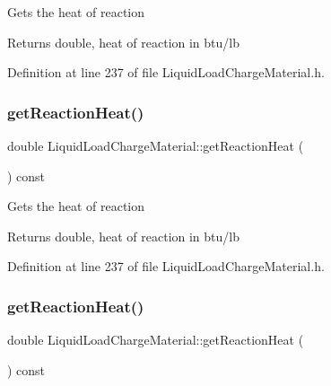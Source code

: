 Gets the heat of reaction \begin{DoxyReturn}{Returns}
double, heat of reaction in btu/lb 
\end{DoxyReturn}


Definition at line 237 of file Liquid\+Load\+Charge\+Material.\+h.

\mbox{\label{class_liquid_load_charge_material_a2f0c26e789e98efd1e8fd0c8741ddd92}} 
\subsubsection{\texorpdfstring{get\+Reaction\+Heat()}{getReactionHeat()}\hspace{0.1cm}{\footnotesize\ttfamily [2/3]}}
{\footnotesize\ttfamily double Liquid\+Load\+Charge\+Material\+::get\+Reaction\+Heat (\begin{DoxyParamCaption}{ }\end{DoxyParamCaption}) const\hspace{0.3cm}{\ttfamily [inline]}}

Gets the heat of reaction \begin{DoxyReturn}{Returns}
double, heat of reaction in btu/lb 
\end{DoxyReturn}


Definition at line 237 of file Liquid\+Load\+Charge\+Material.\+h.

\mbox{\label{class_liquid_load_charge_material_a2f0c26e789e98efd1e8fd0c8741ddd92}} 
\subsubsection{\texorpdfstring{get\+Reaction\+Heat()}{getReactionHeat()}\hspace{0.1cm}{\footnotesize\ttfamily [3/3]}}
{\footnotesize\ttfamily double Liquid\+Load\+Charge\+Material\+::get\+Reaction\+Heat (\begin{DoxyParamCaption}{ }\end{DoxyParamCaption}) const\hspace{0.3cm}{\ttfamily [inline]}}

